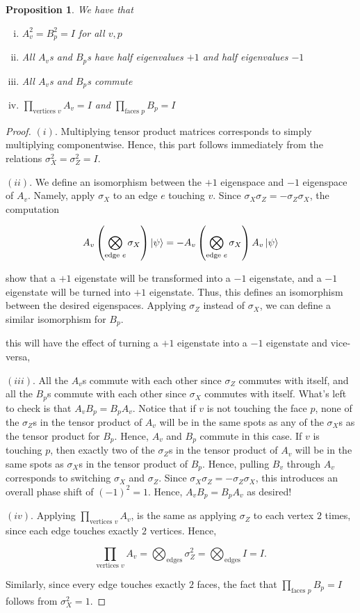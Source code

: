 \documentclass{article}
\newtheorem{proposition}{Proposition}[section]
\theoremstyle{definition}
\numberwithin{figure}{section}
\begin{document}
\begin{proposition}\label{AvBp}We have that

\begin{enumerate}[(i)]
\item $A_v^2=B_p^2=I$ for all $v,p$
\item All $A_v$s and $B_p$s have half eigenvalues $+1$ and half eigenvalues $-1$
\item All $A_v$s and $B_p$s commute
\item $\prod_{\text{vertices }v}A_v=I$ and $\prod_{\text{faces }p}B_p=I$
\end{enumerate}

\end{proposition}
\begin{proof}
$(i).$ Multiplying tensor product matrices corresponds to simply multiplying componentwise. Hence, this part  follows immediately from the relations $\sigma_X^2=\sigma_Z^2=I$.

$(ii).$ We define an isomorphism between the $+1$ eigenspace and $-1$ eigenspace of $A_v$. Namely, apply $\sigma_X$ to  an edge $e$ touching $v$. Since $\sigma_X\sigma_Z=-\sigma_Z\sigma_X$, the computation

$$A_v \left(\bigotimes_{\text{edge }e}\sigma_X\right)\left|\psi\right> = -A_v \left(\bigotimes_{\text{edge }e}\sigma_X\right)A_v\left|\psi\right> $$

show that a $+1$ eigenstate will be transformed into a $-1$ eigenstate, and a $-1$ eigenstate will be turned into $+1$ eigenstate. Thus, this defines an isomorphism between the desired eigenspaces. Applying $\sigma_Z$ instead of $\sigma_X$, we can define a similar isomorphism for $B_p$.

this will have the effect of turning a $+1$ eigenstate into a $-1$ eigenstate and vice-versa,

$(iii).$ All the $A_v$s commute with each other since $\sigma_Z$ commutes with itself, and all the $B_p$s commute with each other since $\sigma_X$ commutes with itself. What's left to check is that $A_vB_p=B_pA_v$. Notice that if $v$ is not touching the face $p$, none of the $\sigma_Z$s in the tensor product of $A_v$ will be in the same spots as any of the $\sigma_X$s as the tensor product for $B_p$. Hence, $A_v$ and $B_p$ commute in this case. If $v$ is touching $p$, then exactly two of the $\sigma_Z$s in the tensor product of $A_v$ will be in the same spots as $\sigma_X$s in the tensor product of $B_p$. Hence, pulling $B_v$ through $A_v$ corresponds to switching $\sigma_X$ and $\sigma_Z$. Since $\sigma_X\sigma_Z=-\sigma_Z\sigma_X$, this introduces an overall phase shift of $(-1)^2=1$. Hence, $A_vB_p=B_pA_v$ as desired!

$(iv).$ Applying $\prod_{\text{vertices } v}A_v$, is the same as applying $\sigma_Z$ to each vertex $2$ times, since each edge touches exactly $2$ vertices. Hence,

$$\prod_{\text{vertices } v}A_v=\bigotimes_{\text{edges}}\sigma^2_Z=\bigotimes_{\text{edges}}I=I.$$

Similarly, since every edge touches exactly $2$ faces, the fact that $\prod_{\text{faces } p}B_p=I$ follows from $\sigma^2_X=1$.
\end{proof}
\end{document}
